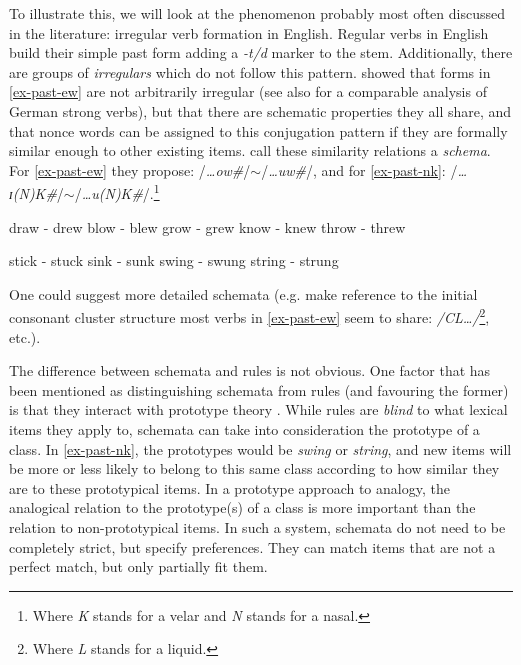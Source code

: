 To illustrate this, we will look at the phenomenon probably most often discussed in the literature: irregular verb formation in English. Regular verbs in English build their simple past form adding a \textit{-t/d} marker to the stem. Additionally, there are groups of \textit{irregulars} which do not follow this pattern. \textcite{Bybee.1982} showed that forms in \ref{ex-past-ew} are not arbitrarily irregular (see also \textcite{Kopcke.1998a} for a comparable analysis of German strong verbs), but that there are schematic properties they all share, and that nonce words can be assigned to this conjugation pattern if they are formally similar enough to other existing items. \textcite{Bybee.1982} call these similarity relations a \textit{schema}. For \ref{ex-past-ew} they propose: /\textit{\dots ow\#}/$\sim$/\textit{\dots uw\#}/, and for \ref{ex-past-nk}: /\textit{\dots ɪ(N)K\#}/$\sim$/\textit{\dots u(N)K\#}/.\footnote{Where \textit{K} stands for a velar and \textit{N} stands for a nasal.}

\begin{exe}
    \ex \label{ex-past-ew}
    \begin{xlist}
        \ex draw - drew
        \ex blow - blew
        \ex grow - grew
        \ex know - knew
        \ex throw - threw
    \end{xlist}

    \ex \label{ex-past-nk}
    \begin{xlist}
        \ex stick - stuck
        \ex sink - sunk
        \ex swing - swung
        \ex string - strung
    \end{xlist}
\end{exe}

One could suggest more detailed schemata (e.g. make reference to the initial consonant cluster structure most verbs in \ref{ex-past-ew} seem to share: \textit{/CL\dots/}\footnote{Where \textit{L} stands for a liquid.}, etc.).

The difference between schemata and rules is not obvious. One factor that has been mentioned as distinguishing schemata from rules (and favouring the former) is that they interact with prototype theory \autocite{Kopcke.1998a}. While rules are \textit{blind} to what lexical items they apply to, schemata can take into consideration the prototype of a class. In \ref{ex-past-nk}, the prototypes would be \textit{swing} or \textit{string}, and new items will be more or less likely to belong to this same class according to how similar they are to these prototypical items. In a prototype approach to analogy, the analogical relation to the prototype(s) of a class is more important than the relation to non-prototypical items. In such a system, schemata do not need to be completely strict, but specify preferences. They can match items that are not a perfect match, but only partially fit them.


